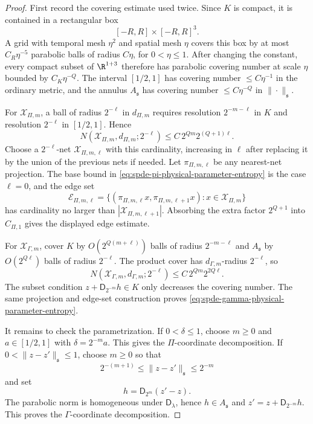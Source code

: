 \begin{proof}
First record the covering estimate used twice.  Since \(K\) is compact, it is
contained in a rectangular box
\[
  [-R,R]\times[-R,R]^3 .
\]
A grid with temporal mesh \(\eta^2\) and spatial mesh \(\eta\) covers this box
by at most \(C_R\eta^{-5}\) parabolic balls of radius \(C\eta\), for
\(0<\eta\leq1\).  After changing the constant, every compact subset of
\(\R^{1+3}\) therefore has parabolic covering number at scale \(\eta\) bounded
by \(C_K\eta^{-Q}\).  The interval \([1/2,1]\) has covering number
\(\leq C\eta^{-1}\) in the ordinary metric, and the annulus
\(A_{\mathfrak s}\) has covering number \(\leq C\eta^{-Q}\) in
\(\|\cdot\|_{\mathfrak s}\).

For \(\mathcal X_{\Pi,m}\), a ball of radius \(2^{-\ell}\) in
\(d_{\Pi,m}\) requires resolution \(2^{-m-\ell}\) in \(K\) and resolution
\(2^{-\ell}\) in \([1/2,1]\).  Hence
\[
  N(\mathcal X_{\Pi,m},d_{\Pi,m};2^{-\ell})
  \leq
  C\,2^{Qm}2^{(Q+1)\ell}.
\]
Choose a \(2^{-\ell}\)-net \(\mathcal X_{\Pi,m,\ell}\) with this cardinality,
increasing in \(\ell\) after replacing it by the union of the previous nets if
needed.  Let \(\pi_{\Pi,m,\ell}\) be any nearest-net projection.  The base
bound in \eqref{eq:spde-pi-physical-parameter-entropy} is the case \(\ell=0\),
and the edge set
\[
  \mathcal E_{\Pi,m,\ell}
  =
  \{(\pi_{\Pi,m,\ell}x,\pi_{\Pi,m,\ell+1}x):x\in\mathcal X_{\Pi,m}\}
\]
has cardinality no larger than \(|\mathcal X_{\Pi,m,\ell+1}|\).  Absorbing the
extra factor \(2^{Q+1}\) into \(C_{\Pi,1}\) gives the displayed edge estimate.

For \(\mathcal X_{\Gamma,m}\), cover \(K\) by \(O(2^{Q(m+\ell)})\) balls of
radius \(2^{-m-\ell}\) and \(A_{\mathfrak s}\) by \(O(2^{Q\ell})\) balls of
radius \(2^{-\ell}\).  The product cover has \(d_{\Gamma,m}\)-radius
\(2^{-\ell}\), so
\[
  N(\mathcal X_{\Gamma,m},d_{\Gamma,m};2^{-\ell})
  \leq
  C\,2^{Qm}2^{2Q\ell}.
\]
The subset condition \(z+\mathsf D_{2^{-m}}h\in K\) only decreases the covering
number.  The same projection and edge-set construction proves
\eqref{eq:spde-gamma-physical-parameter-entropy}.

It remains to check the parametrization.  If \(0<\delta\leq1\), choose
\(m\geq0\) and \(a\in[1/2,1]\) with \(\delta=2^{-m}a\).  This gives the
\(\Pi\)-coordinate decomposition.  If \(0<\|z-z'\|_{\mathfrak s}\leq1\), choose
\(m\geq0\) so that
\[
  2^{-(m+1)}
  \leq
  \|z-z'\|_{\mathfrak s}
  \leq
  2^{-m}
\]
and set
\[
  h=\mathsf D_{2^m}(z'-z).
\]
The parabolic norm is homogeneous under \(\mathsf D_\lambda\), hence
\(h\in A_{\mathfrak s}\) and \(z'=z+\mathsf D_{2^{-m}}h\).  This proves the
\(\Gamma\)-coordinate decomposition.
\end{proof}


